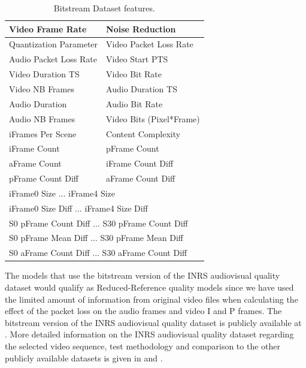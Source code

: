 \documentclass[journal]{IEEEtran}
\begin{document}
\begin{table}
\centering
\caption{Bitstream Dataset features.}
\label{tab:parameters}
\begin{tabular}{|l|l|} \hline
Video Frame Rate & Noise Reduction \\ \hline
Quantization Parameter &  Video Packet Loss Rate \\ \hline
Audio Packet Loss Rate & Video Start PTS \\ \hline
Video Duration TS & Video Bit Rate \\ \hline
Video NB Frames & Audio Duration TS \\ \hline
Audio Duration & Audio Bit Rate \\ \hline
Audio NB Frames & Video Bits (Pixel*Frame) \\ \hline
iFrames Per Scene & Content Complexity \\ \hline
iFrame Count & pFrame Count \\ \hline
aFrame Count & iFrame Count Diff \\ \hline
pFrame Count Diff & aFrame Count Diff \\ \hline
\multicolumn{2}{|l|}{iFrame0 Size ... iFrame4 Size } \\ \hline
\multicolumn{2}{|l|}{iFrame0 Size Diff ... iFrame4 Size Diff } \\ \hline
\multicolumn{2}{|l|}{S0 pFrame Count Diff ... S30 pFrame Count Diff } \\ \hline
\multicolumn{2}{|l|}{S0 pFrame Mean Diff ... S30 pFrame Mean Diff } \\ \hline
\multicolumn{2}{|l|}{S0 aFrame Count Diff ... S30 aFrame Count Diff } \\ \hline
\end{tabular}
\vspace{-0.3cm}
\end{table}

The models that use the bitstream version of the INRS audiovisual quality dataset would qualify as Reduced-Reference quality models since we have used the limited amount of information from original video files when calculating the effect of the packet loss on the audio frames and video I and P frames. The bitstream version of the INRS audiovisual quality dataset is publicly available at \cite{demirbilek2016githubINRSdataset}. More detailed information on the INRS audiovisual quality dataset regarding the selected video sequence, test methodology and comparison to the other publicly available datasets is given in \cite{demirbilek2017parametricmodels} and \cite{demirbilek2016inrsquality}. 
\end{document}
